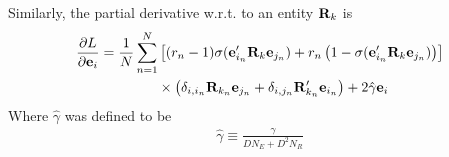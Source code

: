 \documentclass[a4paper, 12pt, fleqn]{article}
\begin{document}
Similarly, the partial derivative w.r.t. to an entity  ${\bf R}_k$ is
\begin{align}
  \frac{\partial L}{\partial {\bf e}_i} =
  \frac{1}{N}\sum_{n=1}^{N}&\left[(r_n - 1)\sigma({\bf
      e}'_{i_n}{\bf R}_{k}{\bf e}_{j_n}) + r_n \left( 1 - \sigma({\bf
        e}'_{i_n}{\bf R}_{k}{\bf e}_{j_n}) \right)\right] \nonumber \\
  &\times \left( \delta_{i,i_n}{\bf R}_{k_n}
    {\bf e}_{j_n} + \delta_{i,j_n}{\bf R}'_{k_n} {\bf
      e}_{i_n}\right) + 2\hat\gamma {\bf e}_i
\end{align}
Where $\hat\gamma$ was defined to be
\begin{align}
\hat\gamma \equiv \frac{\gamma}{DN_E+ D^2N_R}
\end{align}





\end{document}
